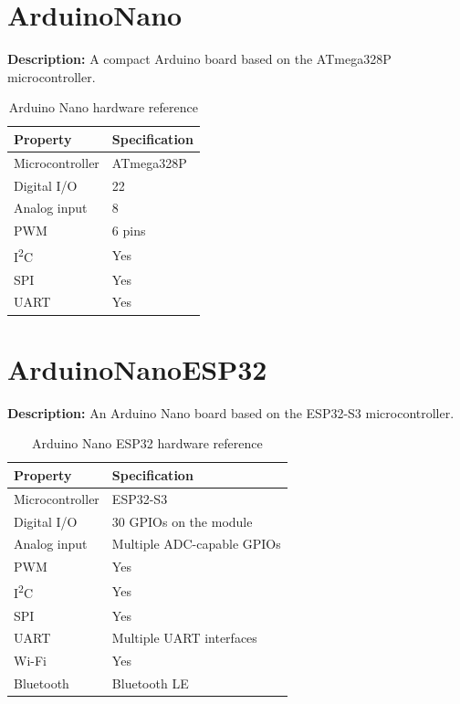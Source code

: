 \section{ArduinoNano}

\textbf{Description:} A compact Arduino board based on the ATmega328P
microcontroller.

\begin{table}[H]
\centering
\caption{Arduino Nano hardware reference}
\label{tab:board-nano}
\begin{tabular}{ll}
\toprule
\textbf{Property} & \textbf{Specification} \\
\midrule
Microcontroller & ATmega328P \\
Digital I/O & 22 \\
Analog input & 8 \\
PWM & 6 pins \\
I\textsuperscript{2}C & Yes \\
SPI & Yes \\
UART & Yes \\
\bottomrule
\end{tabular}
\end{table}

\newpage
\section{ArduinoNanoESP32}

\textbf{Description:} An Arduino Nano board based on the ESP32-S3
microcontroller.

\begin{table}[H]
\centering
\caption{Arduino Nano ESP32 hardware reference}
\label{tab:board-nano-esp32}
\begin{tabular}{ll}
\toprule
\textbf{Property} & \textbf{Specification} \\
\midrule
Microcontroller & ESP32-S3 \\
Digital I/O & 30 GPIOs on the module \\
Analog input & Multiple ADC-capable GPIOs \\
PWM & Yes \\
I\textsuperscript{2}C & Yes \\
SPI & Yes \\
UART & Multiple UART interfaces \\
Wi-Fi & Yes \\
Bluetooth & Bluetooth LE \\
\bottomrule
\end{tabular}
\end{table}

